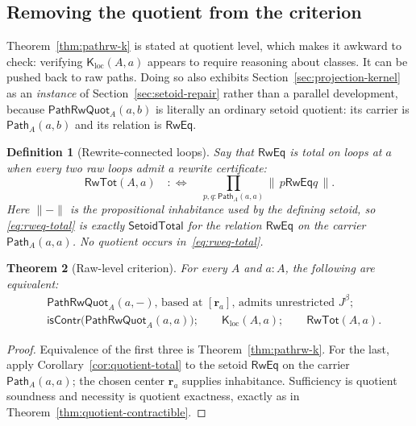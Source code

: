 \documentclass[10pt,reqno]{amsart}
\newtheorem{theorem}{Theorem}[section]
\newtheorem{definition}[theorem]{Definition}
\newcommand{\isContr}{\mathsf{isContr}}
\newcommand{\RwTot}{\mathsf{RwTot}}
\newcommand{\PathTy}{\mathsf{Path}}
\newcommand{\SetTot}{\mathsf{SetoidTotal}}
\newcommand{\PRW}{\mathsf{PathRwQuot}}
\newcommand{\LocalK}{\mathsf K_{\mathrm{loc}}}
\begin{document}
\subsection{Removing the quotient from the criterion}
\label{subsec:raw-criterion}

Theorem~\ref{thm:pathrw-k} is stated at quotient level, which makes it awkward
to check: verifying \(\LocalK(A,a)\) appears to require reasoning about
classes.  It can be pushed back to raw paths.  Doing so also exhibits
Section~\ref{sec:projection-kernel} as an \emph{instance} of
Section~\ref{sec:setoid-repair} rather than a parallel development, because
\(\PRW_A(a,b)\) is literally an ordinary setoid quotient: its carrier is
\(\PathTy_A(a,b)\) and its relation is \(\mathsf{RwEq}\).

\begin{definition}[Rewrite-connected loops]
\label{def:rweq-total}
Say that \(\mathsf{RwEq}\) is \emph{total on loops at \(a\)} when every two raw
loops admit a rewrite certificate:
\[
 \RwTot(A,a)
 \quad:\!\!\Longleftrightarrow\quad
 \prod_{p,q:\PathTy_A(a,a)}
   \bigl\|\,p\mathrel{\mathsf{RwEq}}q\,\bigr\|.
\tag{10.7}\label{eq:rweq-total}
\]
Here \(\|-\|\) is the propositional inhabitance used by the defining setoid, so
\eqref{eq:rweq-total} is exactly \(\SetTot\) for the relation \(\mathsf{RwEq}\)
on the carrier \(\PathTy_A(a,a)\).  No quotient occurs
in~\eqref{eq:rweq-total}.
\end{definition}

\begin{theorem}[Raw-level criterion]
\label{thm:raw-criterion}
For every \(A\) and \(a:A\), the following are equivalent:
\[
\begin{split}
 &\text{\(\PRW_A(a,-)\), based at \([\mathbf r_a]\), admits
   unrestricted \(J^\beta\);}\\
 &\isContr\bigl(\PRW_A(a,a)\bigr);\qquad
  \LocalK(A,a);\qquad
  \RwTot(A,a).
\end{split}
\tag{10.8}\label{eq:raw-criterion}
\]
\end{theorem}

\begin{proof}
Equivalence of the first three is Theorem~\ref{thm:pathrw-k}.  For the last,
apply Corollary~\ref{cor:quotient-total} to the setoid \(\mathsf{RwEq}\) on the
carrier \(\PathTy_A(a,a)\); the chosen center \(\mathbf r_a\) supplies
inhabitance.  Sufficiency is quotient soundness and necessity is quotient
exactness, exactly as in Theorem~\ref{thm:quotient-contractible}.
\end{proof}
\end{document}
